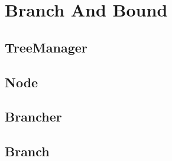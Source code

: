 \documentclass[10pt]{report}
\begin{document}
\chapter{Branch And Bound}

\section{TreeManager}

\section{Node}

\section{Brancher}

\section{Branch}
\end{document}
